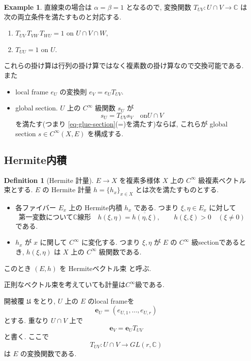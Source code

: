 \documentclass[dvipdfmx,a4paper,11pt]{article} %
\theoremstyle{definition}
\newtheorem{defn}[thm]{Definition}
\newtheorem{example}[thm]{Example}
\theoremstyle{remark}
\numberwithin{equation}{section}
\newcommand{\C}{\mathbb{C}}
\begin{document}
\begin{example}

直線束の場合は \(\alpha=\beta=1\) となるので, 変換関数 \(T_{UV} : U \cap V \to \C\) は次の両立条件を満たすものと対応する.
\begin{enumerate}
\item[(G-1)] $T_{UV}\,T_{VW}\,T_{WU}=1
\text{ on } U\cap V\cap W,$
\item[(G-2)] $T_{UU}=1
\text{ on } U.$
\end{enumerate}
これらの掛け算は行列の掛け算ではなく複素数の掛け算なので交換可能である. また
\begin{itemize}
\item local frame \(e_U\) の変換則 \(e_V=e_U T_{UV}\).
\item global section. \(U\) 上の \(C^{\infty}\) 級関数 \(s_U\) が
\[
s_U=T_{UV}s_V \quad \text{on} U\cap V
\]
を満たす(つまり \eqref{eq-glue-section}(=)を満たす)ならば, これらが global section \(s\in C^\infty(X,E)\) を構成する.
\end{itemize}
\end{example}


\subsection{Hermite内積}

\begin{defn}[Hermite 計量]
\(E\to X\) を複素多様体 \(X\) 上の \(C^\infty\) 級複素ベクトル束とする. \(E\) の Hermite 計量 \(h=\{h_x \}_{x \in X}\) とは次を満たすものとする.
\begin{itemize}
\item 各ファイバー \(E_x\) 上の Hermite内積 \(h_x\) である. つまり \(\xi,\eta\in E_x\) に対して
\[
\text{第一変数について$\C$線形}
\quad
h(\xi,\eta)=\overline{h(\eta,\xi)},\qquad h(\xi,\xi)>0\quad(\xi\neq 0)
\]
である.
\item \(h_x\) が \(x\) に関して \(C^\infty\) に変化する. つまり \(\xi,\eta\) が \(E\) の \(C^\infty\) 級sectionであるとき, \(h(\xi,\eta)\) は \(X\) 上の \(C^\infty\) 級関数である.
\end{itemize}
このとき \((E,h)\) を Hermiteベクトル束 と呼ぶ.
\end{defn}
正則なベクトル束を考えていても計量は$C^\infty$級である. 

開被覆 \(\mathfrak{U}\) をとり, \(U\) 上の \(E\) のlocal frameを
\[
\mathbf{e}_U=(e_{U,1},\ldots,e_{U,r})
\]
とする. 重なり \(U\cap V\) 上で
\[
\mathbf{e}_V=\mathbf{e}_U T_{UV}
\]
と書く. ここで
\[
T_{UV}\colon U\cap V\longrightarrow GL(r,\mathbb{C})
\]
は \(E\) の変換関数である.
\end{document}
